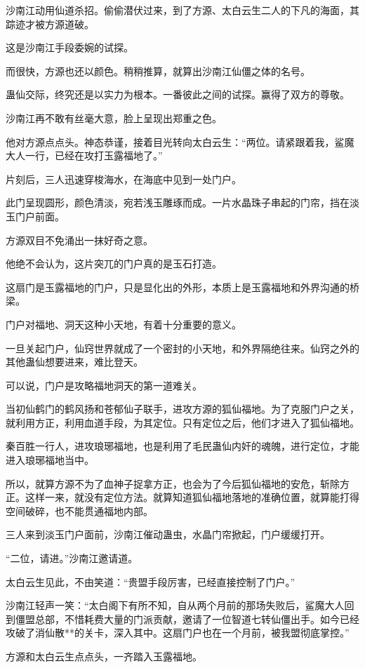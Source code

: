 \begin{this_body}
沙南江动用仙道杀招。偷偷潜伏过来，到了方源、太白云生二人的下凡的海面，其踪迹才被方源道破。

这是沙南江手段委婉的试探。

而很快，方源也还以颜色。稍稍推算，就算出沙南江仙僵之体的名号。

蛊仙交际，终究还是以实力为根本。一番彼此之间的试探。赢得了双方的尊敬。

沙南江再不敢有丝毫大意，脸上呈现出郑重之色。

他对方源点点头。神态恭谨，接着目光转向太白云生：“两位。请紧跟着我，鲨魔大人一行，已经在攻打玉露福地了。”

片刻后，三人迅速穿梭海水，在海底中见到一处门户。

此门呈现圆形，颜色清淡，宛若浅玉雕琢而成。一片水晶珠子串起的门帘，挡在淡玉门户前面。

方源双目不免涌出一抹好奇之意。

他绝不会认为，这片突兀的门户真的是玉石打造。

这扇门是玉露福地的门户，只是显化出的外形，本质上是玉露福地和外界沟通的桥梁。

门户对福地、洞天这种小天地，有着十分重要的意义。

一旦关起门户，仙窍世界就成了一个密封的小天地，和外界隔绝往来。仙窍之外的其他蛊仙想要进来，难比登天。

可以说，门户是攻略福地洞天的第一道难关。

当初仙鹤门的鹤风扬和苍郁仙子联手，进攻方源的狐仙福地。为了克服门户之关，就利用方正，利用血道手段，为其定位。只有定位之后，他们才进入了狐仙福地。

秦百胜一行人，进攻琅琊福地，也是利用了毛民蛊仙内奸的魂魄，进行定位，才能进入琅琊福地当中。

所以，就算方源不为了血神子捉拿方正，也会为了今后狐仙福地的安危，斩除方正。这样一来，就没有定位方法。就算知道狐仙福地落地的准确位置，就算能打得空间破碎，也不能贯通福地内部。

三人来到淡玉门户面前，沙南江催动蛊虫，水晶门帘掀起，门户缓缓打开。

“二位，请进。”沙南江邀请道。

太白云生见此，不由笑道：“贵盟手段厉害，已经直接控制了门户。”

沙南江轻声一笑：“太白阁下有所不知，自从两个月前的那场失败后，鲨魔大人回到僵盟总部，不惜耗费大量的门派贡献，邀请了一位智道七转仙僵出手。如今已经攻破了消仙散**的关卡，深入其中。这扇门户也在一个月前，被我盟彻底掌控。”

方源和太白云生点点头，一齐踏入玉露福地。


\end{this_body}
